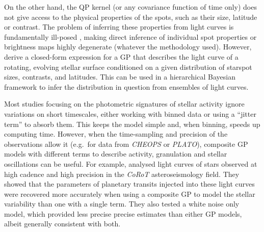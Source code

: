 \documentclass[letterpaper]{ar-1col}
\begin{document}
On the other hand, the QP kernel (or any covariance function of time only) does not give access to the physical properties of the spots, such as their size, latitude or contrast. The problem of inferring these properties from light curves is fundamentally ill-posed \citep{2021AJ....162..123L}, making direct inference of individual spot properties or brightness maps highly degenerate (whatever the methodology used). However, \citet{2021AJ....162..124L} derive a closed-form expression for a GP that describes the light curve of a rotating, evolving stellar surface conditioned on a given distribution of starspot sizes, contrasts, and latitudes. This can be used in a hierarchical Bayesian framework to infer the distribution in question from ensembles of light curves.

Most studies focusing on the photometric signatures of stellar activity ignore variations on short timescales, either working with binned data or using a ``jitter term'' to absorb them. This keeps the model simple and, when binning, speeds up computing time. However, when the time-sampling and precision of the observations allow it (e.g.\ for data from \textit{CHEOPS} or \textit{PLATO}), composite GP models with different terms to describe activity, granulation and stellar oscillations can be useful. For example, \citet{2020A&A...634A..75B} analysed light curves of stars observed at high cadence and high precision in the \textit{CoRoT} asteroseismology field. They showed that the parameters of planetary transits injected into these light curves were recovered more accurately when using a composite GP to model the stellar variability than one with a single term. They also tested a white noise only model, which provided less precise precise estimates than either GP models, albeit generally consistent with both.
\end{document}
